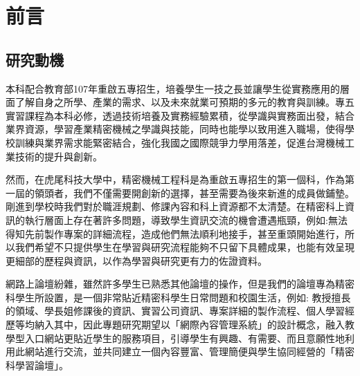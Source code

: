 \setcounter{chapter}{0}
\chapter{前言}
\setcounter{page}{1}  %
\renewcommand{\baselinestretch}{10} %
\section{研究動機}
\par
\renewcommand{\baselinestretch}{2} %
\fontsize{12pt}\baselineskip\selectfont\qquad 本科配合教育部107年重啟五專招生，培養學生一技之長並讓學生從實務應用的層面了解自身之所學、產業的需求、以及未來就業可預期的多元的教育與訓練。專五實習課程為本科必修，透過技術培養及實務經驗累積，從學識與實務面出發，結合業界資源，學習產業精密機械之學識與技能，同時也能學以致用進入職場，使得學校訓練與業界需求能緊密結合，強化我國之國際競爭力學用落差，促進台灣機械工業技術的提升與創新。\\
\par
\renewcommand{\baselinestretch}{1} %
\fontsize{12pt}\baselineskip\selectfont\hspace{0.5em} 然而，在虎尾科技大學中，精密機械工程科是為重啟五專招生的第一個科，作為第一屆的領頭者，我們不僅需要開創新的選擇，甚至需要為後來新進的成員做鋪墊。剛進到學校時我們對於職涯規劃、修課內容和科上資源都不太清楚。在精密科上資訊的執行層面上存在著許多問題，導致學生資訊交流的機會遭遇瓶頸，例如:無法得知先前製作專案的詳細流程，造成他們無法順利地接手，甚至重頭開始進行，所以我們希望不只提供學生在學習與研究流程能夠不只留下具體成果，也能有效呈現更細部的歷程與資訊，以作為學習與研究更有力的佐證資料。\\
\par
\renewcommand{\baselinestretch}{1} %
\fontsize{12pt}\baselineskip\selectfont\hspace{0.5em} 網路上論壇紛雜，雖然許多學生已熟悉其他論壇的操作，但是我們的論壇專為精密科學生所設置，是一個非常貼近精密科學生日常問題和校園生活，例如: 教授擅長的領域、學長姐修課後的資訊、實習公司資訊、專案詳細的製作流程、個人學習經歷等均納入其中，因此專題研究期望以「網際內容管理系統」的設計概念，融入教學型入口網站更貼近學生的服務項目，引導學生有興趣、有需要、而且意願性地利用此網站進行交流，並共同建立一個內容豐富、管理簡便與學生協同經營的「精密科學習論壇」。
\par

\renewcommand{\baselinestretch}{20} %
